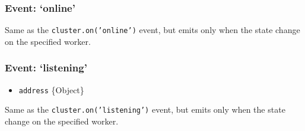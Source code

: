 \begin{Shaded}
\begin{Highlighting}[]
\NormalTok{\} } \NormalTok{\{}

  \NormalTok{(}
    \NormalTok{(}\NormalTok{);}
    \NormalTok{(}\NormalTok{);}

    \NormalTok{(\{ }\NormalTok{: } \NormalTok{\});}
  \NormalTok{(}\NormalTok{);}
\NormalTok{\}}
\end{Highlighting}
\end{Shaded}

\subsubsection{Event: `online'}

Same as the \texttt{cluster.on('online')} event, but emits only when the
state change on the specified worker.

\begin{Shaded}
\begin{Highlighting}[]
\NormalTok{(}\NormalTok{, }\NormalTok{() \{}
\NormalTok{\});}
\end{Highlighting}
\end{Shaded}

\subsubsection{Event: `listening'}

\begin{itemize}
\item
  \texttt{address} \{Object\}
\end{itemize}

Same as the \texttt{cluster.on('listening')} event, but emits only when
the state change on the specified worker.

\begin{Shaded}
\begin{Highlighting}[]
\NormalTok{(}\NormalTok{, }
\NormalTok{\});}
\end{Highlighting}
\end{Shaded}


